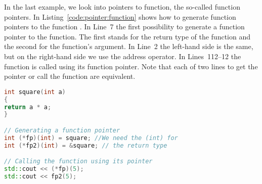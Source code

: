 In the last example, we look into pointers to function, the so-called function pointers. In Listing~\ref{code:pointer:function} shows how to generate function pointers to the function . In Line~7 the first possibility to generate a function pointer to the  function. The first  stands for the return type of the function and the second  for the function's argument. In Line~2 the left-hand side is the same, but on the right-hand side we use the address operator. In Lines~112--12 the function is called using its function pointer. Note that each of two lines to get the pointer or call the function are equivalent. 


\begin{lstlisting}[language=c++,caption={Example for function pointers.
\label{code:pointer:function}},float,floatplacement=tb]
int square(int a)
{
return a * a;
}

// Generating a function pointer
int (*fp)(int) = square; //We need the (int) for
int (*fp2)(int) = &square; // the return type

// Calling the function using its pointer
std::cout << (*fp)(5);
std::cout << fp2(5);

\end{lstlisting}

